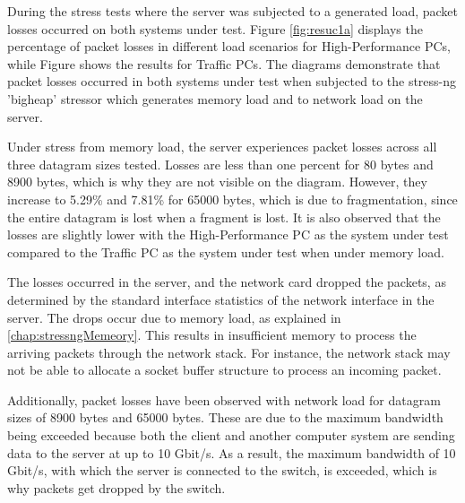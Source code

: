 During the stress tests where the server was subjected to a generated load, packet losses occurred on both systems under test. Figure \ref{fig:resuc1a} displays the percentage of packet losses in different load scenarios for High-Performance PCs, while Figure \label{fig:resuc1b} shows the results for Traffic PCs. The diagrams demonstrate that packet losses occurred in both systems under test when subjected to the stress-ng 'bigheap' stressor which generates memory load and to network load on the server.

Under stress from memory load, the server experiences packet losses across all three datagram sizes tested. Losses are less than one percent for 80 bytes and 8900 bytes, which is why they are not visible on the diagram. However, they increase to 5.29\% and 7.81\% for 65000 bytes, which is due to fragmentation, since the entire datagram is lost when a fragment is lost. It is also observed that the losses are slightly lower with the High-Performance PC as the system under test compared to the Traffic PC as the system under test when under memory load.

The losses occurred in the server, and the network card dropped the packets, as determined by the standard interface statistics of the network interface in the server. The drops occur due to memory load, as explained in \ref{chap:stressngMemeory}. This results in insufficient memory to process the arriving packets through the network stack. For instance, the network stack may not be able to allocate a socket buffer structure to process an incoming packet.

Additionally, packet losses have been observed with network load for datagram sizes of 8900 bytes and 65000 bytes. These are due to the maximum bandwidth being exceeded because both the client and another computer system are sending data to the server at up to 10 Gbit/s. As a result, the maximum bandwidth of 10 Gbit/s, with which the server is connected to the switch, is exceeded, which is why packets get dropped by the switch.

